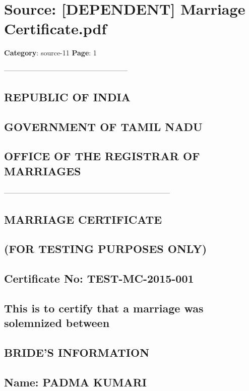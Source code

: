 \section*{Source: [DEPENDENT] Marriage Certificate.pdf}
\textbf{Category}: source-11
\textbf{Page}: 1

-----------------------------------------------------

\subsection*{REPUBLIC OF INDIA}

\subsection*{GOVERNMENT OF TAMIL NADU}

\subsection*{OFFICE OF THE REGISTRAR OF MARRIAGES}

-----------------------------------------------------------------------

\subsection*{MARRIAGE CERTIFICATE}

\subsection*{(FOR TESTING PURPOSES ONLY)}

\subsection*{Certificate No: TEST-MC-2015-001}

\subsection*{This is to certify that a marriage was solemnized between}

\subsection*{BRIDE'S INFORMATION}

\subsection*{Name: PADMA KUMARI}

